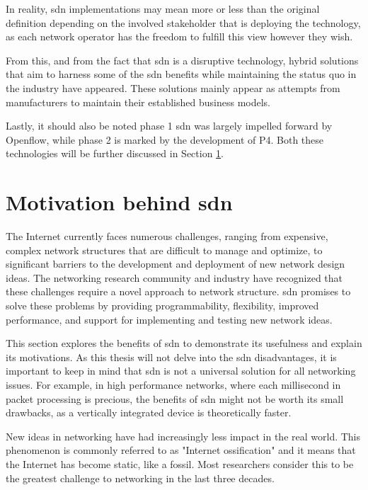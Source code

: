 In reality, \gls{sdn} implementations may mean more or less than the original definition depending on the involved stakeholder that is deploying the technology, as each network operator has the freedom to fulfill this view however they wish. \cite{peterson_software-defined_2021}

From this, and from the fact that \gls{sdn} is a disruptive technology, hybrid solutions that aim to harness some of the \gls{sdn} benefits while maintaining the status quo in the industry have appeared. These solutions mainly appear as attempts from manufacturers to maintain their established business models. \cite{peterson_software-defined_2021}

Lastly, it should also be noted phase 1 \gls{sdn} was largely impelled forward by Openflow, while phase 2 is marked by the development of P4. Both these technologies will be further discussed in Section \ref{}.


\section[Motivation behind SDN]{Motivation behind \gls{sdn}}

The Internet currently faces numerous challenges, ranging from expensive, complex network structures that are difficult to manage and optimize, to significant barriers to the development and deployment of new network design ideas. The networking research community and industry have recognized that these challenges require a novel approach to network structure. \gls{sdn} promises to solve these problems by providing programmability, flexibility, improved performance, and support for implementing and testing new network ideas.

This section explores the benefits of \gls{sdn} to demonstrate its usefulness and explain its motivations. As this thesis will not delve into the \gls{sdn} disadvantages, it is important to keep in mind that \gls{sdn} is not a universal solution for all networking issues. For example, in high performance networks, where each millisecond in packet processing is precious, the benefits of \gls{sdn} might not be worth its small drawbacks, as a vertically integrated device is theoretically faster\cite{nunes_survey_2014}. 


New ideas in networking have had increasingly less impact in the real world. This phenomenon is commonly referred to as "Internet ossification" and it means that the Internet has become static, like a fossil\cite{nunes_survey_2014}. Most researchers consider this to be the greatest challenge to networking in the last three decades.


